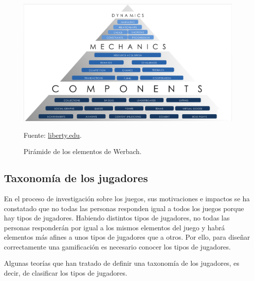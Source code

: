 \begin{figure}[hbt]
\begin{center}
\caption{Pirámide de los elementos de Werbach.}
\label{fig::Bartle}
\includegraphics[scale=0.90]{img/Pyramid.png}

\vspace{-0.25cm}
\small{Fuente: \href{http://www.liberty.edu/academics/cafe/index.cfm?id=891255&blogpid=32579&pid=9720}{liberty.edu}.}
\end{center}
\end{figure}
\FloatBarrier



\subsection{Taxonomía de los jugadores}

%
En el proceso de investigación sobre los juegos, sus motivaciones e impactos se ha constatado que no todas las personas responden igual a todos los juegos porque hay tipos de jugadores. 
%
Habiendo distintos tipos de jugadores, no todas las personas responderán por igual a los mismos elementos del juego y habrá elementos más afines a unos tipos de jugadores que a otros. 
%
Por ello, para diseñar correctamente una gamificación es necesario conocer los tipos de jugadores.

Algunas teorías que han tratado de definir una taxonomía de los jugadores, es decir, de clasificar los tipos de jugadores.

